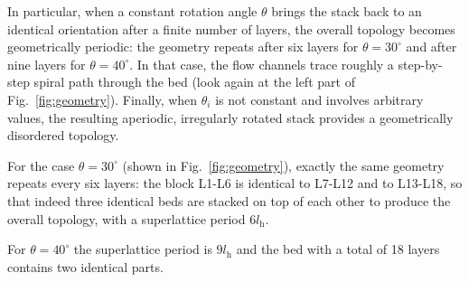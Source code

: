 In particular, when a constant rotation angle $\theta$ brings the stack back to an identical orientation after a finite number of layers, the overall topology becomes geometrically periodic: the geometry repeats after six layers for $\theta=30^\circ$ and after nine layers for $\theta=40^\circ$. In that case, the flow channels trace roughly a step-by-step spiral path through the bed (look again at the left part of Fig.~\ref{fig:geometry}). Finally, when $\theta_i$ is not constant and involves arbitrary values, the resulting aperiodic, irregularly rotated stack provides a geometrically disordered topology.

For the case $\theta=30^\circ$ (shown in Fig.~\ref{fig:geometry}), exactly the same geometry repeats every six layers: the block L1-L6 is identical to L7-L12 and to L13-L18, so that indeed three identical beds are stacked on top of each other to produce the overall topology, with a superlattice period $6 l_\mathrm{h}$.

For $\theta = 40^\circ$ the superlattice period is $9 l_\mathrm{h}$ and the bed with a total of 18 layers contains two identical parts.



